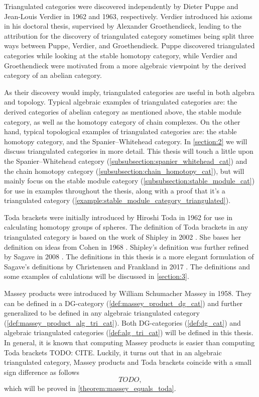 Triangulated categories were discovered independently by Dieter Puppe and Jean-Louis Verdier in 1962 and 1963, respectively. Verdier introduced his axioms in his doctoral thesis, supervised by Alexander Groethendieck, leading to the attribution for the discovery of triangulated category sometimes being split three ways between Puppe, Verdier, and Groethendieck. Puppe discovered triangulated categories while looking at the stable homotopy category, while Verdier and Groethendieck were motivated from a more algebraic viewpoint by the derived category of an abelian category.

As their discovery would imply, triangulated categories are useful in both algebra and topology. Typical algebraic examples of triangulated categories are: the derived categories of abelian category as mentioned above, the stable module category, as well as the homotopy category of chain complexes. On the other hand, typical topological examples of triangulated categories are: the stable homotopy category, and the Spanier--Whitehead category. In \autoref{section:2} we will discuss triangulated categories in more detail. This thesis will touch a little upon the Spanier--Whitehead category (\autoref{subsubsection:spanier_whitehead_cat}) and the chain homotopy category (\autoref{subsubsection:chain_homotopy_cat}), but will mainly focus on the stable module category (\autoref{subsubsection:stable_module_cat}) for use in examples throughout the thesis, along with a proof that it's a triangulated category (\autoref{example:stable_module_category_triangulated}).

Toda brackets were initially introduced by Hiroshi Toda in 1962 for use in calculating homotopy groups of spheres. The definition of Toda brackets in any triangulated category is based on the work of Shipley in 2002 \cite[Definition A.2]{Shipley_2002}. She bases her definition on ideas from Cohen in 1968 \cite[Definition at the bottom of p. 308]{Cohen_1968}. Shipley's definition was further refined by Sagave in 2008 \cite[Remark 4.5]{Sagave_2008}. The definitions in this thesis is a more elegant formulation of Sagave's definitions by Christensen and Frankland in 2017 \cite[Definition 3.1]{Christensen-Frankland_2017}. The definitions and some examples of calulations will be discussed in \autoref{section:3}.

Massey products were introduced by William Schumacher Massey in 1958. They can be defined in a DG-category (\autoref{def:massey_product_dg_cat}) and further generalized to be defined in any algebraic triangulated category (\autoref{def:massey_product_alg_tri_cat}). Both DG-categories (\autoref{def:dg_cat}) and algebraic triangulated categories (\autoref{def:alg_tri_cat}) will be defined in this thesis. In general, it is known that computing Massey products is easier than computing Toda brackets TODO: CITE. Luckily, it turns out that in an algebraic triangulated category, Massey products and Toda brackets coincide with a small sign difference as follows
\[
    TODO,
\]
which will be proved in \autoref{theorem:massey_equals_toda}.

